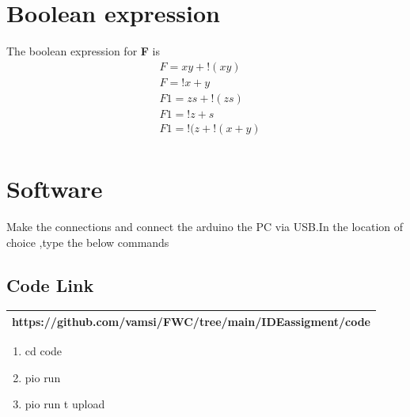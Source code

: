 \section*{\large Boolean expression}
The boolean expression for \textbf{F} is
\begin{align*}%
&F=xy+!(xy)\\
&F=!{x+y}\\
&F1=zs+!(zs)\\
&F1=!{z+s}\\
&F1=!{(z+!(x+y)}\\
\end{align*}

\section*{\large Software}
Make the connections and connect the arduino the PC via USB.In the location of choice ,type the below commands\\
\subsection{Code Link}
\vspace{5mm}
\begin{table}[h]
    \centering
    \begin{tabular}{|c|}
    \hline 
    https://github.com/vamsi/FWC/tree/main/IDEassigment/code  \\
        \hline
    \end{tabular}
\end{table}
\vspace{5mm}
\begin{enumerate}
\item cd code
\item pio run
\item pio run \-t upload
\end{enumerate}


